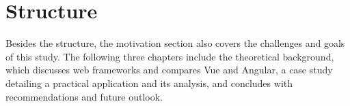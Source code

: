 \section{Structure}
Besides the structure, the motivation section also covers the challenges and goals of this study. The following three chapters include the theoretical background, which discusses web frameworks and compares Vue and Angular, a case study detailing a practical application and its analysis, and concludes with recommendations and future outlook.
